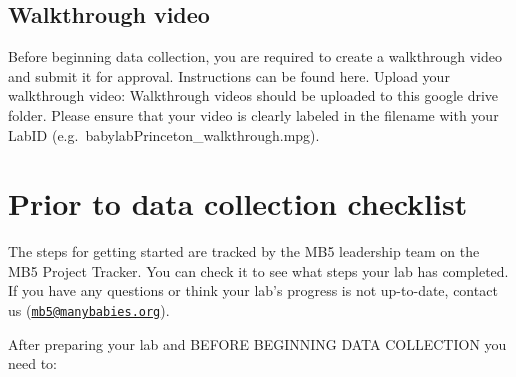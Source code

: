 \documentclass[
]{book}
\begin{document}
\section{Walkthrough video}\label{walkthrough-video-1}

Before beginning data collection, you are required to create a walkthrough video and submit it for approval. Instructions can be found here.
Upload your walkthrough video:
Walkthrough videos should be uploaded to this google drive folder. Please ensure that your video is clearly labeled in the filename with your LabID (e.g.~babylabPrinceton\_walkthrough.mpg).

\chapter{Prior to data collection checklist}\label{prior-to-data-collection-checklist}

The steps for getting started are tracked by the MB5 leadership team on the MB5 Project Tracker. You can check it to see what steps your lab has completed. If you have any questions or think your lab's progress is not up-to-date, contact us (\href{mailto:mb5@manybabies.org}{\nolinkurl{mb5@manybabies.org}}).

After preparing your lab and BEFORE BEGINNING DATA COLLECTION you need to:
\end{document}
